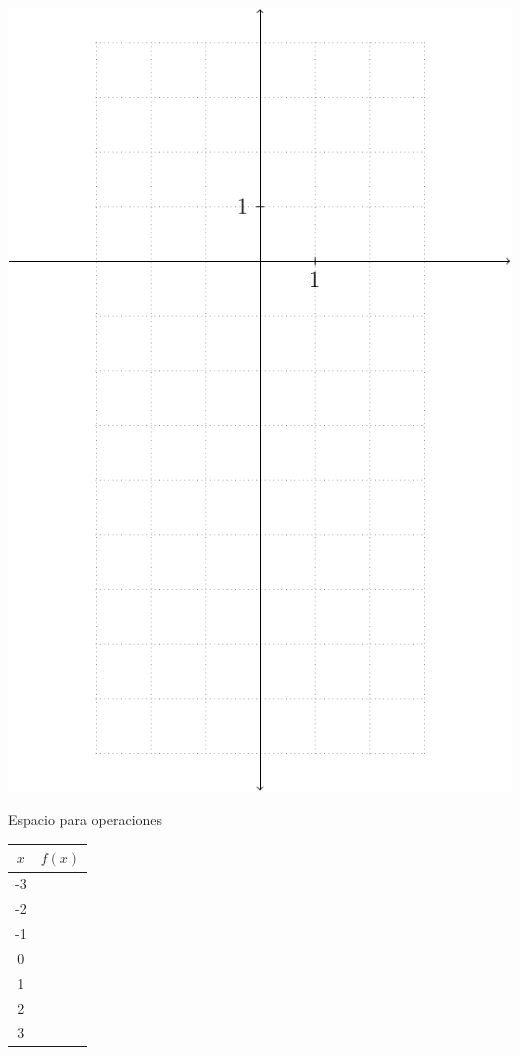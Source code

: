 \documentclass[letterpaper,fleqn]{article}
\begin{document}
\begin{enumerate}
 \begin{minipage}{.45\textwidth}
\includegraphics[scale=.85]{Images/plano.pdf}
\end{minipage}\hfill
\begin{minipage}{.45\textwidth}
Espacio para operaciones
\begin{tabular}{|c|c|}
\hline 
$x$ & $f(x)$ \\ 
\hline 
-3 &  \\ 
\hline 
-2 &  \\ 
\hline 
-1 &  \\ 
\hline 
0 &  \\ 
\hline 
1 &  \\ 
\hline 
2 &  \\ 
\hline 
3 &  \\ 
\hline 
\end{tabular} 
\end{minipage}
 \end{enumerate}
\end{document}
